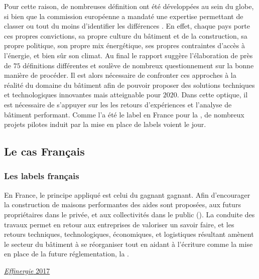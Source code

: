 Pour cette raison, de nombreuses définition ont été développées au sein du globe,
si bien que la commission européenne a mandaté une expertise permettant de classer ou
tout du moins d’identifier les différences \parencite{ECOFYS2013}.
En effet, chaque pays porte ces propres
convictions, sa propre culture du bâtiment et de la construction, sa propre politique,
son propre mix énergétique, ses propres contraintes d’accès à l’énergie, et bien sûr
son climat.
Au final le rapport suggère l’élaboration de près de $75$ définitions différentes
et soulève de nombreux questionnement sur la bonne manière de procéder.
Il est alors nécessaire de confronter ces approches à la réalité du domaine du bâtiment
afin de pouvoir proposer des solutions techniques et technologiques innovantes mais
atteignable pour $2020$. Dans cette optique, il est nécessaire de s’appuyer sur les
les retours d’expériences et l’analyse de bâtiment performant. Comme
l’a été le label  en France pour la , de nombreux projets pilotes
induit par la mise en place de labels voient le jour.



\subsection{Le cas Français} %
\label{sub:le_cas_francais}
\subsubsection{Les labels français} %
\label{ssub:les_labels_francais}
En France, le principe appliqué est celui du gagnant gagnant. Afin d’encourager
la construction de maisons performantes des aides sont proposées, aux futurs propriétaires
dans le privée, et aux collectivités dans le public ().
La conduite des travaux permet en retour aux entreprises de valoriser un savoir faire, et
les retours techniques, technologiques, économiques, et logistiques résultant amènent
le secteur du bâtiment à se réorganiser tout en aidant à l’écriture comme la mise en place
de la future réglementation, la .

\href{http://www.certivea.fr/offres/label-effinergie-2017}{\textit{Effinergie} 2017}

